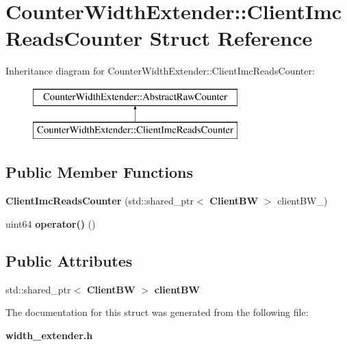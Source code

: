 \section{Counter\+Width\+Extender\+:\+:Client\+Imc\+Reads\+Counter Struct Reference}
\label{structCounterWidthExtender_1_1ClientImcReadsCounter}
Inheritance diagram for Counter\+Width\+Extender\+:\+:Client\+Imc\+Reads\+Counter\+:\begin{figure}[H]
\begin{center}
\leavevmode
\includegraphics[height=2.000000cm]{structCounterWidthExtender_1_1ClientImcReadsCounter}
\end{center}
\end{figure}
\subsection*{Public Member Functions}
\begin{DoxyCompactItemize}
\item 
{\bfseries Client\+Imc\+Reads\+Counter} (std\+::shared\+\_\+ptr$<$ {\bf Client\+BW} $>$ client\+B\+W\+\_\+)\label{structCounterWidthExtender_1_1ClientImcReadsCounter_abf1eb49eba1237aa421c17515d4f2cbc}

\item 
uint64 {\bfseries operator()} ()\label{structCounterWidthExtender_1_1ClientImcReadsCounter_a2ce041afc601d13a4c19d75c2fae548f}

\end{DoxyCompactItemize}
\subsection*{Public Attributes}
\begin{DoxyCompactItemize}
\item 
std\+::shared\+\_\+ptr$<$ {\bf Client\+BW} $>$ {\bfseries client\+BW}\label{structCounterWidthExtender_1_1ClientImcReadsCounter_a5bdef13d0d61c44507001729451d6222}

\end{DoxyCompactItemize}


The documentation for this struct was generated from the following file\+:\begin{DoxyCompactItemize}
\item 
{\bf width\+\_\+extender.\+h}\end{DoxyCompactItemize}

